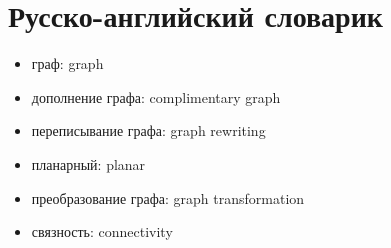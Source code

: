 
\chapter{Русско-английский словарик}

\begin{itemize}
	\item граф: graph
	\item дополнение графа: complimentary graph
	\item переписывание графа: graph rewriting
	\item планарный: planar
	\item преобразование графа: graph transformation
	\item связность: connectivity
\end{itemize}
